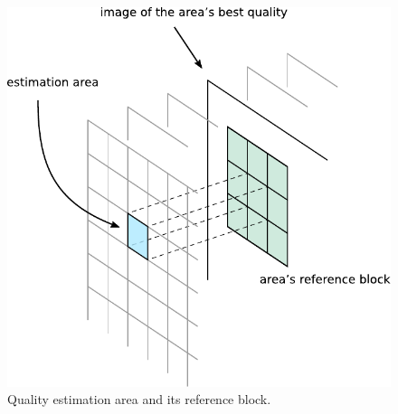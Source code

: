 \documentclass[12pt]{article}
\begin{document}
\begin{figure}[H]
\centering
\includegraphics{qual_area_ref_block.pdf}
\caption{Quality estimation area and its reference block.}
\label{fig:quality_ref_block}
\end{figure}
\end{document}
